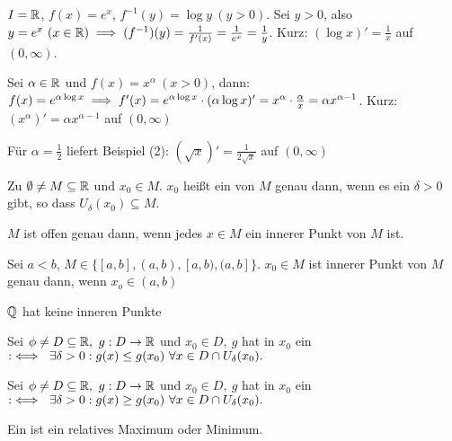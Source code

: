 \documentclass[a4paper,twoside,DIV15,BCOR12mm]{scrbook}
\begin{document}
\begin{beispiele}
\item $I=\mathbb{R}$, $f(x) = e^x$, $f^{-1}(y) = \log y\ (y>0)$. Sei $y>0$, also $y=e^x\ (x\in\mathbb{R}) \implies (f^{-1})(y) = \frac{1}{f'(x)} = \frac{1}{e^x} = \frac{1}{y}$. Kurz: $(\log x)' = \frac{1}{x}$ auf $(0,\infty)$.
\item Sei $\alpha \in\mathbb{R}$ und $f(x) = x^\alpha \ (x>0)$, dann: $f(x) = e^{\alpha \log x} \implies f'(x) = e^{\alpha \log x}\cdot (\alpha \log x)' = x^\alpha\cdot\frac{\alpha}{x} = \alpha x^{\alpha-1}$. Kurz: $(x^\alpha)' = \alpha x^{\alpha-1}$ auf $(0,\infty)$
\item Für $\alpha = \frac{1}{2}$ liefert Beispiel (2): $(\sqrt{x})' = \frac{1}{2\sqrt{x}}$ auf $(0,\infty)$
\end{beispiele}

\begin{definition}
Zu $\emptyset \ne M \subseteq \mathbb{R}$ und $x_0\in M$. $x_0$ heißt ein  von $M$ genau dann, wenn es ein $\delta>0$ gibt, so dass $U_\delta(x_0) \subseteq M$.
\end{definition}

\begin{beispiele}
\item $M$ ist offen genau dann, wenn jedes $x\in M$ ein innerer Punkt von $M$ ist.
\item Sei $a<b$, $M\in\{ [a,b], (a,b), [a,b), (a,b] \}$. $x_0 \in M$ ist innerer Punkt von $M$ genau dann, wenn $x_o\in(a,b)$
\item $\mathbb{Q}$ hat keine inneren Punkte
\end{beispiele}

\begin{definition}
Sei $\phi \ne D \subseteq \mathbb{R},\ g: D \to \mathbb{R}$ und $x_0 \in D,\ g$ hat in $x_0$ ein  $:\iff\ \exists \delta>0: g(x)\leq g(x_0)\ \forall x \in D \cap U_\delta(x_0).$

Sei $\phi \ne D \subseteq \mathbb{R},\ g: D \to \mathbb{R}$ und $x_0 \in D,\ g$ hat in $x_0$ ein  $:\iff\ \exists \delta>0: g(x)\geq g(x_0)\ \forall x \in D \cap U_\delta(x_0).$

Ein  ist ein relatives Maximum oder Minimum.
\end{definition}
\end{document}
